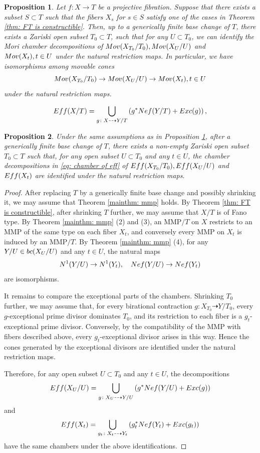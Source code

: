 \documentclass[10pt,a4paper]{amsart}
\newtheorem{proposition}{Proposition}
\newcommand{\Eff}{{\rm {Eff}}}
\newcommand{\Exc}{{\rm {Exc}}}
\newcommand{\Mov}{{\rm {Mov}}}
\newcommand{\Nef}{{\rm {Nef}}}
\newcommand{\bc}{{\rm {bc}}}
\begin{document}
\begin{proposition}\label{prop: mov}
Let $f: X \to T$ be a projective fibration. Suppose that there exists a subset $S\subset T$ such that the fibers $X_s$ for $s\in S$ satisfy one of the cases in Theorem \ref{thm: FT is constructible}. Then, up to a generically finite base change of $T$, there exists a Zariski open subset $T_0\subset T$, such that for any $U\subset T_0$, we can identify the Mori chamber decompositions of $\Mov(X_{T_0}/T_0), \Mov(X_{U}/U)$ and $ \Mov(X_t), t\in U$ under the natural restriction maps. In particular, we have isomorphisms among movable cones 
\[
\Mov(X_{T_0}/T_0) \to \Mov(X_U/U) \to \Mov(X_t), t\in U
\] under the natural restriction maps.
\end{proposition}

\begin{equation}\label{eq: chamber of eff}
\Eff(X/T)
=
\bigcup_{g\colon X \dashrightarrow Y/T}
\left(g^*\Nef(Y/T) + \Exc(g)\right),
\end{equation}

\begin{proposition}\label{prop: Mori chamber for Eff}
Under the same assumptions as in Proposition \ref{prop: mov}, after a
generically finite base change of $T$, there exists a non-empty Zariski open
subset $T_0\subset T$ such that, for any open subset $U\subset T_0$ and any
$t\in U$, the chamber decompositions in \eqref{eq: chamber of eff} of $
\Eff(X_{T_0}/T_0), \Eff(X_U/U)$ and $\Eff(X_t)$ are identified under the natural restriction maps.
\end{proposition}

\begin{proof}
After replacing $T$ by a generically finite base change and possibly shrinking
it, we may assume that Theorem \ref{mainthm: mmp} holds. By Theorem
\ref{thm: FT is constructible}, after shrinking $T$ further, we may assume that
$X/T$ is of Fano type. By Theorem \ref{mainthm: mmp} (2) and (3), an MMP$/T$ on $X$ restricts to an
MMP of the same type on each fiber $X_t$, and conversely every MMP on $X_t$ is
induced by an MMP$/T$. By Theorem
\ref{mainthm: mmp} (4), for any $Y/U\in \bc(X_U/U)$ and any $t\in U$, the
natural maps
\[
N^1(Y/U) \to N^1(Y_t), \quad
\Nef(Y/U) \to \Nef(Y_t)
\]
are isomorphisms.

It remains to compare the exceptional parts of the chambers. Shrinking $T_0$
further, we may assume that, for every birational contraction
$g\colon X_{T_0}\dashrightarrow Y/T_0$, every $g$-exceptional prime divisor
dominates $T_0$, and its restriction to each fiber is a $g_t$-exceptional
prime divisor. Conversely, by the compatibility of the MMP with fibers
described above, every $g_t$-exceptional divisor arises in this way. Hence the
cones generated by the exceptional divisors are identified under the natural
restriction maps.

Therefore, for any open subset $U\subset T_0$ and any $t\in U$, the
decompositions
\[
\Eff(X_U/U)
=
\bigcup_{g\colon X_U\dashrightarrow Y/U}
\left(g^*\Nef(Y/U)+\Exc(g)\right)
\]
and
\[
\Eff(X_t)
=
\bigcup_{g_t\colon X_t\dashrightarrow Y_t}
\left(g_t^*\Nef(Y_t)+\Exc(g_t)\right)
\]
have the same chambers under the above identifications.
\end{proof}
\end{document}
